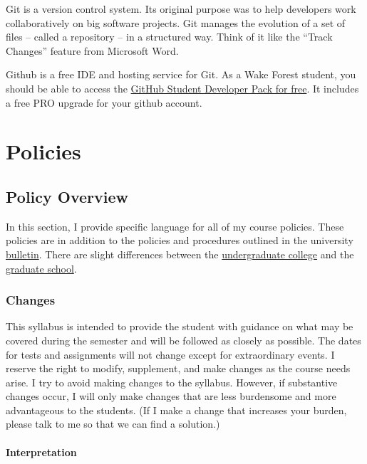 Git is a version control system. Its original purpose was to help developers work collaboratively on big software projects. Git manages the evolution of a set of files -- called a repository -- in a structured way. Think of it like the ``Track Changes'' feature from Microsoft Word.

Github is a free IDE and hosting service for Git. As a Wake Forest student, you should be able to access the \href{https://education.github.com/benefits?type=student}{GitHub Student Developer Pack for free}. It includes a free PRO upgrade for your github account.

\hypertarget{part-policies}{%
\part*{Policies}\label{part-policies}}


\hypertarget{policy-overview}{%
\chapter{Policy Overview}\label{policy-overview}}

In this section, I provide specific language for all of my course policies. These policies are in addition to the policies and procedures outlined in the university \href{https://bulletin.wfu.edu}{bulletin}. There are slight differences between the \href{https://bulletin.wfu.edu/undergraduate/}{undergraduate college} and the \href{https://bulletin.wfu.edu/graduate/}{graduate school}.

\hypertarget{changes}{%
\section{Changes}\label{changes}}

This syllabus is intended to provide the student with guidance on what may be covered during the semester and will be followed as closely as possible. The dates for tests and assignments will not change except for extraordinary events. I reserve the right to modify, supplement, and make changes as the course needs arise. I try to avoid making changes to the syllabus. However, if substantive changes occur, I will only make changes that are less burdensome and more advantageous to the students. (If I make a change that increases your burden, please talk to me so that we can find a solution.)

\hypertarget{interpretation}{%
\subsection{Interpretation}\label{interpretation}}

